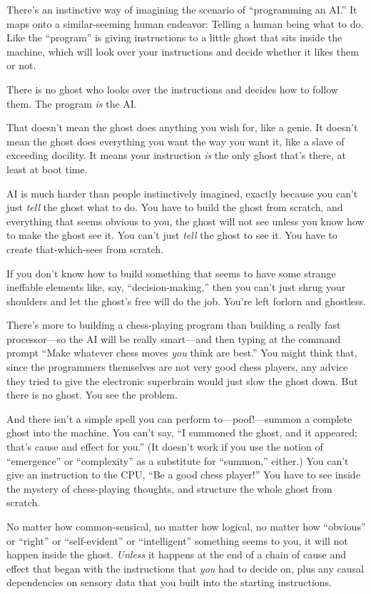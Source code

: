  There's an instinctive way of imagining the
scenario of ``programming an AI.''
It maps onto a similar-seeming human endeavor: Telling a human being
what to do. Like the ``program'' is
giving instructions to a little ghost that sits inside the machine,
which will look over your instructions and decide whether it likes them
or not.


 There is no ghost who looks over the instructions and decides how
to follow them. The program \textit{is} the AI.


 That doesn't mean the ghost does anything you wish
for, like a genie. It doesn't mean the ghost does
everything you want the way you want it, like a slave of exceeding
docility. It means your instruction \textit{is} the only ghost
that's there, at least at boot time.


 AI is much harder than people instinctively imagined, exactly
because you can't just \textit{tell} the ghost what to
do. You have to build the ghost from scratch, and everything that seems
obvious to you, the ghost will not see unless you know how to make the
ghost see it. You can't just \textit{tell} the ghost to
see it. You have to create that-which-sees from scratch.


 If you don't know how to build something that
seems to have some strange ineffable elements like, say,
``decision-making,'' then you
can't just shrug your shoulders and let the
ghost's free will do the job. You're
left forlorn and ghostless.


 There's more to building a chess-playing program
than building a really fast processor---so the AI will be really
smart---and then typing at the command prompt ``Make
whatever chess moves \textit{you} think are best.''
You might think that, since the programmers themselves are not very
good chess players, any advice they tried to give the electronic
superbrain would just slow the ghost down. But there is no ghost. You
see the problem.


 And there isn't a simple spell you can perform
to---poof!---summon a complete ghost into the machine. You
can't say, ``I summoned the ghost, and
it appeared; that's cause and effect for
you.'' (It doesn't work if you use
the notion of ``emergence'' or
``complexity'' as a substitute for
``summon,'' either.) You
can't give an instruction to the CPU,
``Be a good chess player!'' You have
to see inside the mystery of chess-playing thoughts, and structure the
whole ghost from scratch.


 No matter how common-sensical, no matter how logical, no matter
how ``obvious'' or
``right'' or
``self-evident'' or
``intelligent'' something seems to
you, it will not happen inside the ghost. \textit{Unless} it happens at
the end of a chain of cause and effect that began with the instructions
that \textit{you} had to decide on, plus any causal dependencies on
sensory data that you built into the starting instructions.


